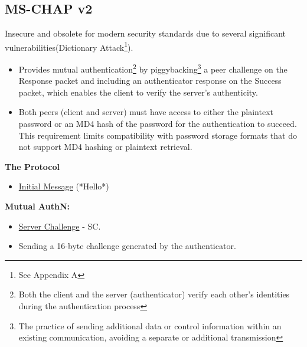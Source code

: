 \subsection{MS-CHAP v2}
\begin{center}
    Insecure and obsolete for modern security standards due \newline to several significant vulnerabilities(Dictionary Attack\footnote{See Appendix A}).
\end{center}
\begin{itemize}
    \item Provides mutual authentication\footnote{Both the client and the server (authenticator) verify each other's identities during the authentication process} by piggybacking\footnote{The practice of sending additional data or control information within an existing communication, avoiding a separate or additional transmission} a peer challenge on the Response packet and including an authenticator response on the Success packet, which enables the client to verify the server's authenticity.
    \item Both peers (client and server) must have access to either the plaintext password or an MD4 hash of the password for the authentication to succeed. This requirement limits compatibility with password storage formats that do not support MD4 hashing or plaintext retrieval.
\end{itemize}

\begin{center}
    \textbf{The Protocol}
\end{center}
\begin{tcolorbox}[colback=yellow!10!white, colframe=yellow!70!black, title=Peer \textrightarrow Authenticator] 
    
    \begin{itemize}
        \item \underline{Initial Message} (*Hello*)
    \end{itemize}
    
\end{tcolorbox}

\textbf{Mutual AuthN:}
\begin{tcolorbox}[colback=yellow!10!white, colframe=yellow!70!black, title=Authenticator \textrightarrow Peer] 
    
    \begin{itemize}
        \item \underline{Server Challenge} - SC.
        \item Sending a 16-byte challenge generated by the authenticator.
    \end{itemize}
    
\end{tcolorbox}

